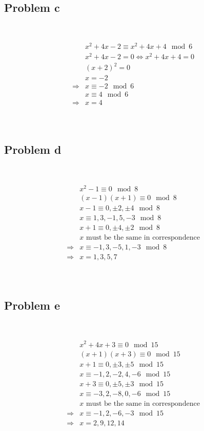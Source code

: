 \documentclass{article}
\begin{document}
~

\subsection*{Problem c}

~

\begin{align*}
    &x^2+4x-2\equiv x^2+4x+4\mod 6\\
    &x^2+4x-2=0\Leftrightarrow x^2+4x+4=0\\
    &(x+2)^2=0\\
    &x=-2\\
    \Rightarrow&x\equiv -2\mod 6\\
    &x\equiv 4\mod6\\
    \Rightarrow& x=4\\
\end{align*}

~

\subsection*{Problem d}

~

\begin{align*}
    &x^2-1\equiv0\mod 8\\
    &(x-1)(x+1)\equiv 0\mod8\\
    &x-1\equiv 0,\pm2,\pm4\mod 8\\
    &x\equiv 1,3,-1,5,-3\mod 8\\
    &x+1\equiv 0,\pm4,\pm2\mod 8\\
    &x\text{ must be the same in correspondence}\\
    \Rightarrow&x\equiv -1,3,-5,1,-3\mod 8\\
    \Rightarrow&x=1,3,5,7\\
\end{align*}

~

\subsection*{Problem e}

~

\begin{align*}
    &x^2+4x+3\equiv 0\mod 15\\
    &(x+1)(x+3)\equiv 0\mod 15\\
    &x+1\equiv 0,\pm3,\pm5\mod 15\\
    &x\equiv -1,2,-2,4,-6\mod 15\\
    &x+3\equiv 0,\pm5,\pm3\mod 15\\
    &x\equiv -3,2,-8,0,-6\mod 15\\
    &x\text{ must be the same in correspondence}\\
    \Rightarrow&x\equiv -1,2,-6,-3\mod 15\\
    \Rightarrow&x=2,9,12,14\\
\end{align*}
\end{document}
